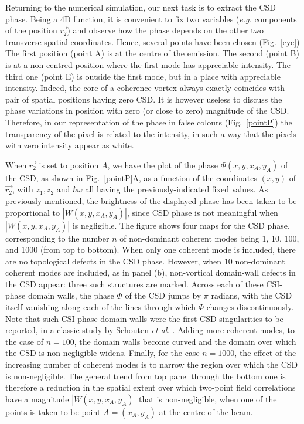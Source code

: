 \documentclass{iucr}              %
\newcommand{\inblue}[1]{{\color{blue}#1}}
\begin{document}
Returning to the numerical simulation, our next task is to extract the CSD phase. Being a 4D function, it is convenient to fix two variables ({\em e.g.} components of the position $\vec{r_2}$) and observe how the phase depends on the other two transverse spatial coordinates. Hence, several points have been chosen (\inblue{Fig.~\ref{eye}}) The first position (point A) is at the centre of the emission. The second (point B) is at a non-centred position where the first mode has appreciable intensity. The third one (point E) is outside the first mode, but in a place with appreciable intensity. Indeed, the core of a coherence vortex always exactly coincides with pair of spatial positions having zero CSD. It is however useless to discuss the phase variations in position with zero (or close to zero) magnitude of the CSD. Therefore, in our representation of the phase in false colours (\inblue{Fig.~\ref{pointP}}) the transparency of the pixel is related to the intensity, in such a way that the pixels with zero intensity appear as white. 

When $\vec{r_2}$ is set to position $A$, we have the plot of the phase $\Phi(x,y,x_A,y_A)$ of the CSD, as shown in \inblue{Fig.~\ref{pointP}A}, as a function of the coordinates $(x,y)$ of $\vec{r_2}$, with $z_1, z_2$ and $\hbar\omega$ all having the previously-indicated fixed values.  As previously mentioned, the brightness of the displayed phase has been taken to be proportional to $|W(x,y,x_A,y_A)|$, since CSD phase is not meaningful when $|W(x,y,x_A,y_A)|$ is negligible.  The figure shows four maps for the CSD phase, corresponding to the number $n$ of non-dominant coherent modes being 1, 10, 100, and 1000 (from top to bottom).  When only one coherent mode is included, there are no topological defects in the CSD phase.  However, when 10 non-dominant coherent modes are included, as in panel (b), non-vortical domain-wall defects in the CSD appear: three such structures are marked.  Across each of these CSI-phase domain walls, the phase $\Phi$ of the CSD jumps by $\pi$ radians, with the CSD itself vanishing along each of the lines through which $\Phi$ changes discontinuously.  Note that such CSI-phase domain walls were the first CSD singularities to be reported, in a classic study by Schouten {\em et al.} \citeyear{Schouten2003}.  Adding more coherent modes, to the case of $n=100$, the domain walls become curved and the domain over which the CSD is non-negligible widens.  Finally, for the case  $n=1000$, the effect of the increasing number of coherent modes is to narrow the region over which the CSD is non-negligible.  The general trend from top panel through the bottom one is therefore a reduction in the spatial extent over which two-point field correlations have a magnitude $|W(x,y,x_A,y_A)|$ that is non-negligible, when one of the points is taken to be point $A=(x_A,y_A)$ at the centre of the beam.           
\end{document}
